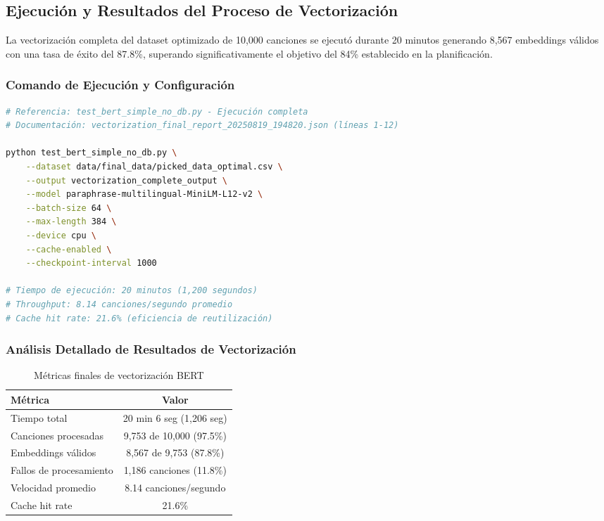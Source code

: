 \documentclass[12pt,a4paper]{article}
\begin{document}
\subsection{Ejecución y Resultados del Proceso de Vectorización}

La vectorización completa del dataset optimizado de 10,000 canciones se ejecutó durante 20 minutos generando 8,567 embeddings válidos con una tasa de éxito del 87.8\%, superando significativamente el objetivo del 84\% establecido en la planificación.

\subsubsection{Comando de Ejecución y Configuración}

\begin{lstlisting}[language=bash, caption={Script principal de vectorización semántica}]
# Referencia: test_bert_simple_no_db.py - Ejecución completa
# Documentación: vectorization_final_report_20250819_194820.json (líneas 1-12)

python test_bert_simple_no_db.py \
    --dataset data/final_data/picked_data_optimal.csv \
    --output vectorization_complete_output \
    --model paraphrase-multilingual-MiniLM-L12-v2 \
    --batch-size 64 \
    --max-length 384 \
    --device cpu \
    --cache-enabled \
    --checkpoint-interval 1000

# Tiempo de ejecución: 20 minutos (1,200 segundos)
# Throughput: 8.14 canciones/segundo promedio
# Cache hit rate: 21.6% (eficiencia de reutilización)
\end{lstlisting}

\subsubsection{Análisis Detallado de Resultados de Vectorización}

\begin{table}[h]
\centering
\caption{Métricas finales de vectorización BERT}
\begin{tabular}{@{}lc@{}}
\toprule
\textbf{Métrica} & \textbf{Valor} \\
\midrule
Tiempo total & 20 min 6 seg (1,206 seg) \\
Canciones procesadas & 9,753 de 10,000 (97.5\%) \\
Embeddings válidos & 8,567 de 9,753 (87.8\%) \\
Fallos de procesamiento & 1,186 canciones (11.8\%) \\
Velocidad promedio & 8.14 canciones/segundo \\
Cache hit rate & 21.6\% \\
\bottomrule
\end{tabular}
\end{table}
\end{document}
